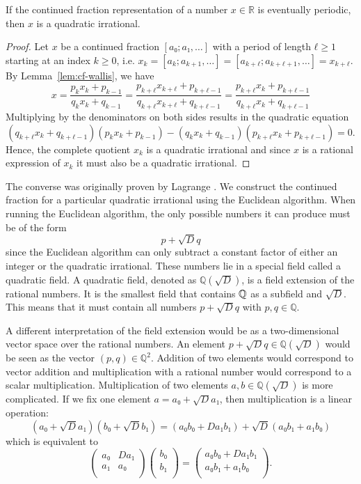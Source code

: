 \begin{theorem}
  If the continued fraction representation of a number $x ∈ ℝ$ is eventually periodic,
  then $x$ is a quadratic irrational.
\end{theorem}

\begin{proof}
  Let $x$ be a continued fraction $[a₀; a₁, …]$ with a period of length $ℓ ≥ 1$
  starting at an index $k ≥ 0$,
  i.e. $x_k = [a_k; a_{k+1}, …] = [a_{k+ℓ}; a_{k+ℓ+1}, …] = x_{k+ℓ}$.
  By Lemma~\ref{lem:cf-wallis}, we have
  \[
    x
    = \frac{p_k x_k + p_{k-1}}{q_k x_k + q_{k-1}}
    = \frac{p_{k+ℓ} x_{k+ℓ} + p_{k+ℓ-1}}{q_{k+ℓ} x_{k+ℓ} + q_{k+ℓ-1}}
    = \frac{p_{k+ℓ} x_k + p_{k+ℓ-1}}{q_{k+ℓ} x_k + q_{k+ℓ-1}}
  \]
  Multiplying by the denominators on both sides results in the quadratic equation
  \[
    (q_{k+ℓ} x_k + q_{k+ℓ-1})(p_k x_k + p_{k-1}) - (q_k x_k + q_{k-1}) (p_{k+ℓ} x_k + p_{k+ℓ-1}) = 0.
  \]
  Hence, the complete quotient $x_k$ is a quadratic irrational and
  since $x$ is a rational expression of $x_k$ it must also be a quadratic irrational.
\end{proof}

The converse was originally proven by Lagrange \cite{Lagrange70}.
We construct the continued fraction for a particular quadratic irrational using
the Euclidean algorithm.
When running the Euclidean algorithm,
the only possible numbers it can produce must be of the form
\[
  p + \sqrt{D} q
\]
since the Euclidean algorithm can only subtract a constant factor of either an
integer or the quadratic irrational.
These numbers lie in a special field called a quadratic field.
A quadratic field, denoted as $ℚ(\sqrt{D})$, is a field extension of the rational numbers.
It is the smallest field that contains ${\mathbb Q}$ as a subfield and $\sqrt{D}$.
This means that it must contain all numbers $p + \sqrt{D} q$ with $p, q ∈ ℚ$.

A different interpretation of the field extension would be as a two-dimensional
vector space over the rational numbers.
An element $p + \sqrt{D} q ∈ ℚ(\sqrt{D})$ would be seen as the vector $(p, q) ∈ ℚ^2$.
Addition of two elements would correspond to vector addition
and multiplication with a rational number would correspond to a scalar multiplication.
Multiplication of two elements $a, b ∈ ℚ(\sqrt{D})$ is more complicated.
If we fix one element $a = a₀ + \sqrt{D} a₁$, then multiplication is a linear operation:
\[
  (a₀ + \sqrt{D} a₁)(b₀ + \sqrt{D} b₁) = (a₀ b₀ + D a₁ b₁) + \sqrt{D} (a₀ b₁ + a₁ b₀)
\]
which is equivalent to
\[
  \begin{pmatrix}
    a₀ & D a₁ \\
    a₁ & a₀ \\
  \end{pmatrix}
  \begin{pmatrix}
    b₀ \\
    b₁ \\
  \end{pmatrix}
  =
  \begin{pmatrix}
    a₀ b₀ + D a₁ b₁ \\
    a₀ b₁ + a₁ b₀ \\
  \end{pmatrix}.
\]

